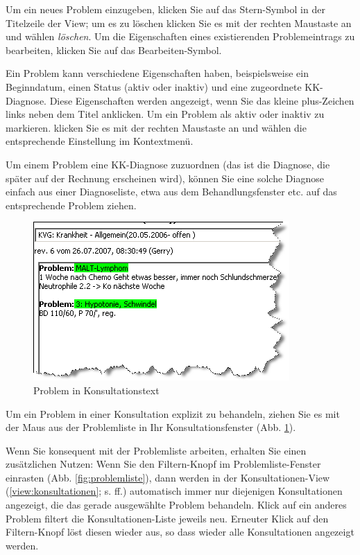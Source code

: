 Um ein neues Problem einzugeben, klicken Sie auf das Stern-Symbol in der Titelzeile der View; um es zu löschen klicken Sie es mit der rechten Maustaste an und wählen \textit{löschen}. Um die Eigenschaften eines existierenden Problemeintrags zu bearbeiten, klicken Sie auf das Bearbeiten-Symbol.

Ein Problem kann verschiedene Eigenschaften haben, beispielsweise ein Beginndatum, einen Status (aktiv oder inaktiv) und eine zugeordnete KK-Diagnose. Diese Eigenschaften werden angezeigt, wenn Sie das kleine plus-Zeichen links neben dem Titel anklicken. Um ein Problem als aktiv oder inaktiv zu markieren. klicken Sie es mit der rechten Maustaste an und wählen die entsprechende Einstellung im Kontextmenü.

Um einem Problem eine KK-Diagnose zuzuordnen (das ist die Diagnose, die später auf der Rechnung erscheinen wird), können Sie eine solche Diagnose einfach aus einer Diagnoseliste, etwa aus dem Behandlungsfenster etc. auf das entsprechende Problem ziehen.

\begin{figure}[ht]
    \includegraphics{images/problemliste2}
    \caption{Problem in Konsultationstext}
    \label{fig:problemliste2}
\end{figure}
Um ein Problem in einer Konsultation explizit zu behandeln, ziehen Sie es mit der Maus aus der Problemliste in Ihr Konsultationsfenster (Abb. \ref{fig:problemliste2}).

Wenn Sie konsequent mit der Problemliste arbeiten, erhalten Sie einen zusätzlichen Nutzen: Wenn Sie den Filtern-Knopf im Problemliste-Fenster einrasten (Abb. \ref{fig:problemliste}), dann werden in der Konsultationen-View (\ref{view:konsultationen}; s. \pageref{view:konsultationen} ff.) automatisch immer nur diejenigen Konsultationen angezeigt, die das gerade ausgewählte Problem behandeln.
\label{filter:problemliste}
 Klick auf ein anderes Problem filtert die Konsultationen-Liste jeweils neu. Erneuter Klick auf den Filtern-Knopf löst diesen wieder aus, so dass wieder alle Konsultationen angezeigt werden.

